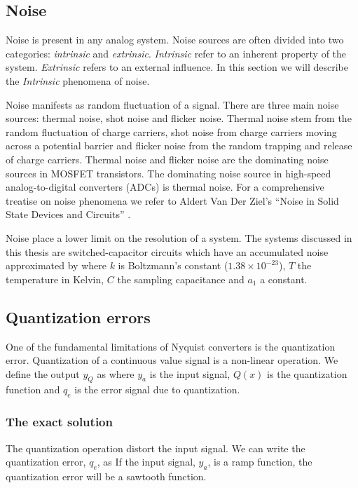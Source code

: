 \subsection{Noise}
Noise is present in any analog system. Noise sources are often divided into two categories: {\em
  intrinsic} and {\em extrinsic}. {\em Intrinsic} refer to an
inherent property of the system. {\em Extrinsic} refers to an external
influence. In this section we will describe the {\em
  Intrinsic} phenomena of noise.

Noise manifests as random fluctuation of a signal. 
There are three main noise sources: thermal noise, shot noise and
flicker noise. Thermal noise stem from the random fluctuation of
charge carriers, shot noise from charge carriers moving across a
potential barrier and flicker noise from the random trapping and release
of charge carriers. Thermal noise and flicker noise are the dominating
noise sources in MOSFET transistors. The dominating noise source in
high-speed analog-to-digital converters (ADCs) is thermal
noise. For a comprehensive treatise on noise phenomena we refer to Aldert Van Der
Ziel's ``Noise in Solid State Devices and Circuits'' \cite{ziel}.

Noise place a lower limit on the resolution of a system. The systems
discussed in this thesis are switched-capacitor circuits which have an
accumulated noise approximated by
where $k$ is Boltzmann's constant ($1.38\times10^{-23}$), $T$ the
temperature in Kelvin, $C$ the sampling capacitance and $a_1$ a
constant. 


\subsection{Quantization errors}
One of the fundamental limitations of Nyquist converters is the
quantization error. Quantization of a continuous value signal is a non-linear
operation. We  define the output $y_Q$ as 
where $y_a$ is the input signal, $Q(x)$ is the quantization function and
$q_e$ is the error signal due to quantization.

\subsubsection{The exact solution}
The quantization operation distort the input signal.  We can write
the quantization error, $q_e$,  as 
If the input signal, $y_a$, is a ramp function, the quantization error will be a
sawtooth function. 

